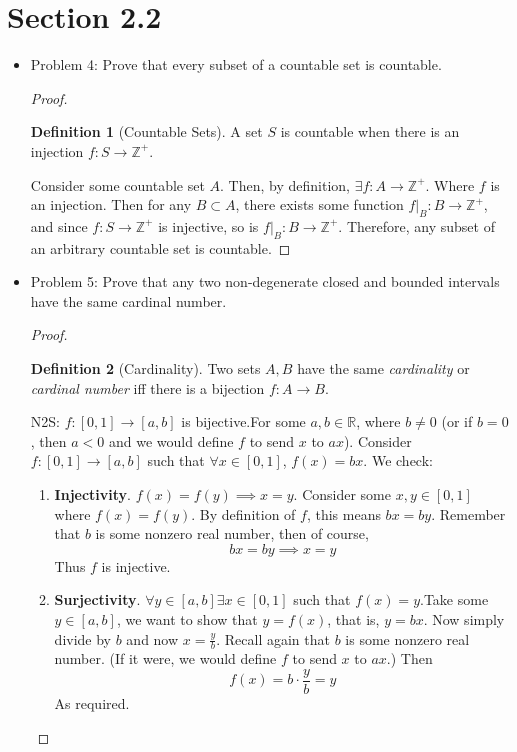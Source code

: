 \documentclass[hidelinks,12pt]{article}
\theoremstyle{definition}
\newtheorem{definition}{Definition}[section]
\newcommand{\R}{\mathbb{R}}
\newcommand{\Z}{\mathbb{Z}}
\begin{document}
\section{Section 2.2}
\begin{itemize}
    \item Problem 4: Prove that every subset of a countable set is countable.\begin{proof} \begin{definition}[Countable Sets]A set $S$ is countable when there is an injection $f:S\to\Z^+$.\end{definition} Consider some countable set $A$. Then, by definition, $\exists f:A\to\Z^+$. Where $f$ is an injection. Then for any $B\subset A$, there exists some function $f|_B:B\to\Z^+$, and since $f:S\to\Z^+$ is injective, so is $f|_B:B\to\Z^+$. Therefore, any subset of an arbitrary countable set is countable.
    \end{proof}
    \item Problem 5: Prove that any two non-degenerate closed and bounded intervals have the same cardinal number.\begin{proof}\begin{definition}[Cardinality]Two sets $A,B$ have the same \emph{cardinality} or \emph{cardinal number} iff there is a bijection $f:A\to B$.\end{definition}
    N2S: $f:[0,1]\to[a,b]$ is bijective.\newline For some $a,b\in\R$, where $b\neq0$ (or if $b=0$, then $a<0$ and we would define $f$ to send $x$ to $ax$). \newline Consider $f:[0,1]\to[a,b]$ such that $\forall x\in[0,1]$, $f(x)=bx$. We check:\begin{enumerate}
        \item \textbf{Injectivity}. $f(x)=f(y)\implies x=y$. \newline Consider some $x,y\in[0,1]$ where $f(x)=f(y)$. By definition of $f$, this means $bx=by$. Remember that $b$ is some nonzero real number, then of course, $$bx=by\implies x=y$$ Thus $f$ is injective.
        \item \textbf{Surjectivity}. $\forall y\in[a,b]\exists x\in[0,1]$ such that $f(x)=y$.\newline Take some $y\in[a,b]$, we want to show that $y=f(x)$, that is, $y=bx$. Now simply divide by $b$ and now $x=\frac{y}{b}$. Recall again that $b$ is some nonzero real number. (If it were, we would define $f$ to send $x$ to $ax$.) Then $$f(x)=b\cdot\frac{y}{b}=y$$ As required.
    \end{enumerate}

\end{proof}
\end{itemize}
\end{document}
